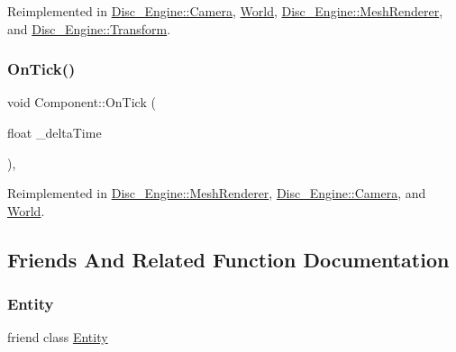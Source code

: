 Reimplemented in \mbox{\hyperlink{class_disc___engine_1_1_camera_a0be8fe3db58db7e2c730a472b93884b5}{Disc\+\_\+\+Engine\+::\+Camera}}, \mbox{\hyperlink{class_world_a44b69f8225145de782c9ace28fed6819}{World}}, \mbox{\hyperlink{class_disc___engine_1_1_mesh_renderer_ac16873520f636cdf1f0afdc0c25ab6ae}{Disc\+\_\+\+Engine\+::\+Mesh\+Renderer}}, and \mbox{\hyperlink{class_disc___engine_1_1_transform_a5cc30c86c2fe43fae5fb88b6c8646894}{Disc\+\_\+\+Engine\+::\+Transform}}.

\mbox{\label{class_disc___engine_1_1_component_a7e322d37c3f5fa0181f2321d08b14527}} 
\subsubsection{\texorpdfstring{On\+Tick()}{OnTick()}}
{\footnotesize\ttfamily void Component\+::\+On\+Tick (\begin{DoxyParamCaption}\item[{float}]{\+\_\+delta\+Time }\end{DoxyParamCaption})\hspace{0.3cm}{\ttfamily [private]}, {\ttfamily [virtual]}}



Reimplemented in \mbox{\hyperlink{class_disc___engine_1_1_mesh_renderer_aa5290108f670218f471ba7553b912c06}{Disc\+\_\+\+Engine\+::\+Mesh\+Renderer}}, \mbox{\hyperlink{class_disc___engine_1_1_camera_aa243d7727350d408386badd8fe2536a3}{Disc\+\_\+\+Engine\+::\+Camera}}, and \mbox{\hyperlink{class_world_a0bbbfa3065f37588fa83f7d5533bcd5b}{World}}.



\subsection{Friends And Related Function Documentation}
\mbox{\label{class_disc___engine_1_1_component_a614439ccac0344926adc4c0165d64060}} 
\subsubsection{\texorpdfstring{Entity}{Entity}}
{\footnotesize\ttfamily friend class \mbox{\hyperlink{class_disc___engine_1_1_entity}{Entity}}\hspace{0.3cm}{\ttfamily [friend]}}



